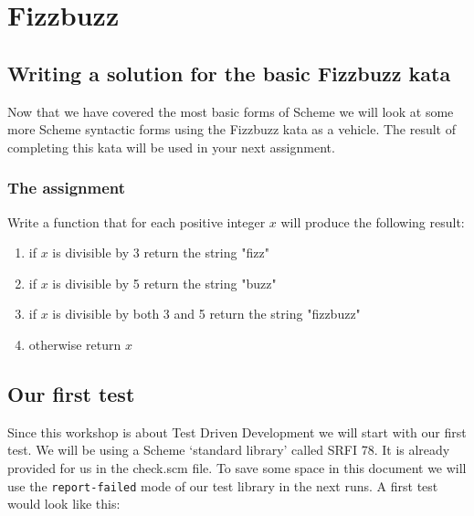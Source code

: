\documentclass[12pt,a4paper,english,twoside]{article}
\begin{document}
\section{Fizzbuzz}
\subsection{Writing a solution for the basic Fizzbuzz kata}
Now that we have covered the most basic forms of Scheme we will look at some 
more Scheme syntactic forms using the Fizzbuzz kata as a vehicle. The result 
of completing this kata will be used in your next assignment.
\subsubsection{The assignment}
Write a function that for each positive integer $x$ will produce the following 
result:
\begin{enumerate}
  \item if $x$ is divisible by 3 return the string "fizz"
  \item if $x$ is divisible by 5 return the string "buzz"
  \item if $x$ is divisible by both 3 and 5 return the string "fizzbuzz"
  \item otherwise return $x$
\end{enumerate}
\subsection{Our first test}
Since this workshop is about Test Driven Development we will start with our 
first test. We will be using a Scheme `standard library' called SRFI 78. It is 
already provided for us in the check.scm file. To save some space in this 
document we will use the \texttt{report-failed} mode of our test library in 
the next runs. A first test would look like this:
\end{document}
